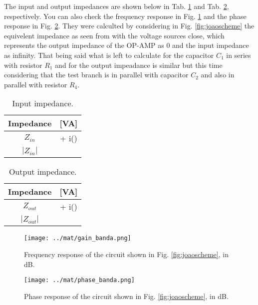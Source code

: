 The input and output impedances are shown below in Tab. \ref{tab:octinput} and Tab. \ref{tab:octoutput}, respectively. You can also check the frequency response in Fig. \ref{fig:octavefreq} and the phase response in Fig. \ref{fig:octavephase}. They were calculted by considering in Fig. \ref{fig:joaoscheme} the equivelent impedance as seen from with the voltage sources close, which represents the output impedance of the OP-AMP as 0 and the input impedance as infinity. That being said what is left to calculate for the capacitor $C_{1}$ in series with resistor $R_{1}$ and for the output impeadance is similar but this time considering that the test branch is in parallel with capacitor $C_{2}$ and also in parallel with resistor $R_{4}$.

\begin{table}[H]
    \centering
    \begin{tabular}{|c|c|}
    	\hline
        Impedance &  [VA]\\ 
        \hline
        $Z_{in}$ &  + i()\\ \hline
        $|Z_{in}|$ & \\ \hline
    \end{tabular}
    \caption{Input impedance.}
    \label{tab:octinput}
\end{table}

\begin{table}[H]
    \centering
    \begin{tabular}{|c|c|}
    	\hline
        Impedance &  [VA]\\ 
        \hline
        $Z_{out}$ &  + i()\\ \hline
        $|Z_{out}|$ & \\ \hline
    \end{tabular}
    \caption{Output impedance.}
    \label{tab:octoutput}
\end{table}

\begin{figure}[H]
    \centering
    \texttt{[image: ../mat/gain\_banda.png]}
    \caption{Frequency response of the circuit shown in Fig. \ref{fig:joaoscheme}, in dB.}
    \label{fig:octavefreq}
\end{figure}

\begin{figure}[H]
    \centering
    \texttt{[image: ../mat/phase\_banda.png]}
    \caption{Phase response of the circuit shown in Fig. \ref{fig:joaoscheme}, in dB.}
    \label{fig:octavephase}
\end{figure}